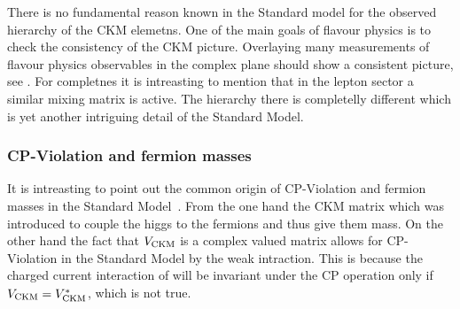 There is no fundamental reason known in the Standard model for the observed hierarchy of the CKM elemetns.
One of the main goals of flavour physics is to check the consistency of the CKM picture.
Overlaying many measurements of flavour physics observables in the complex plane should show a consistent
picture, see . For completnes it is intreasting to mention that in the lepton
sector a similar mixing matrix is active. The hierarchy there is completelly different which is yet another
intriguing detail of the Standard Model.


\subsubsection{CP-Violation and fermion masses}
It is intreasting to point out the common origin of CP-Violation and fermion masses in the Standard Model~\cite{KM-mechanism}.
From the one hand the CKM matrix which was introduced to couple the higgs to the fermions and thus give them mass.
On the other hand the fact that $V_{\rm CKM}$ is a complex valued matrix allows for CP-Violation in the
Standard Model by the weak intraction. This is because the charged current interaction of 
will be invariant under the CP operation only if $V_{\rm CKM}=V_{\rm CKM}^*$, which is not true.
